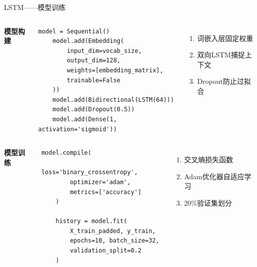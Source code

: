 \documentclass{beamer}
\begin{document}
\begin{frame}[fragile]{LSTM——模型训练}
    \begin{columns}
        \textbf{模型构建}
        \begin{lstlisting}[style=pythonstyle, basicstyle=\tiny]
    model = Sequential()
    model.add(Embedding(
        input_dim=vocab_size,
        output_dim=128,
        weights=[embedding_matrix],
        trainable=False
    ))
    model.add(Bidirectional(LSTM(64)))
    model.add(Dropout(0.5))
    model.add(Dense(1, activation='sigmoid'))
        \end{lstlisting}

        \begin{enumerate}
            \item 词嵌入层固定权重
            \item 双向LSTM捕捉上下文
            \item Dropout防止过拟合
        \end{enumerate}
    \end{columns}

    \begin{columns}
        \textbf{模型训练}
        \begin{lstlisting}[style=pythonstyle, basicstyle=\tiny]
    model.compile(
        loss='binary_crossentropy',
        optimizer='adam',
        metrics=['accuracy']
    )

    history = model.fit(
        X_train_padded, y_train,
        epochs=10, batch_size=32,
        validation_split=0.2
    )
        \end{lstlisting}

        \begin{enumerate}
            \item 交叉熵损失函数
            \item Adam优化器自适应学习
            \item 20\%验证集划分
        \end{enumerate}
    \end{columns}
\end{frame}
\end{document}
